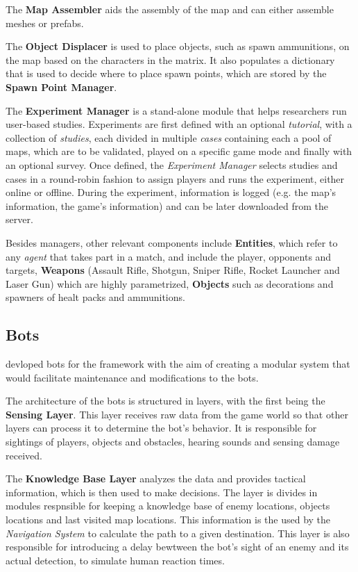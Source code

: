 \documentclass{Configuration_Files/PoliMi3i_thesis}
\begin{document}
The \textbf{Map Assembler} aids the assembly of the map and can either assemble meshes or prefabs.

The \textbf{Object Displacer} is used to place objects, such as spawn ammunitions, on the map based on the characters in the matrix. It also populates a dictionary that is used to decide where to place spawn points, which are stored by the \textbf{Spawn Point Manager}.

The \textbf{Experiment Manager} is a stand-alone module that helps researchers run user-based studies. Experiments are first defined with an optional \textit{tutorial}, with a collection of \textit{studies}, each divided in multiple \textit{cases} containing each a pool of maps, which are to be validated, played on a specific game mode and finally with an optional survey. Once defined, the \textit{Experiment Manager} selects studies and cases in a round-robin fashion to assign players and runs the experiment, either online or offline. During the experiment, information is logged (e.g. the map's information, the game's information) and can be later downloaded from the server.

Besides managers, other relevant components include \textbf{Entities}, which refer to any \textit{agent} that takes part in a match, and include the player, opponents and targets, \textbf{Weapons} (Assault Rifle, Shotgun, Sniper Rifle, Rocket Launcher and Laser Gun) which are highly parametrized, \textbf{Objects} such as decorations and spawners of healt packs and ammunitions. 

\subsection{Bots}
\label{subsec:bots}

\citeauthor{bari_evolutionary-based_2023} devloped bots for the framework with the aim of creating a modular system that would facilitate maintenance and modifications to the bots. \cite{bari_evolutionary-based_2023}

The architecture of the bots is structured in layers, with the first being the \textbf{Sensing Layer}. This layer receives raw data from the game world so that other layers can process it to determine the bot's behavior. It is responsible for sightings of players, objects and obstacles, hearing sounds and sensing damage received.

The \textbf{Knowledge Base Layer} analyzes the data and provides tactical information, which is then used to make decisions. The layer is divides in modules respnsible for keeping a knowledge base of enemy locations, objects locations and last visited map locations. This information is the used by the \textit{Navigation System} to calculate the path to a given destination. This layer is also responsible for introducing a delay bewtween the bot's sight of an enemy and its actual detection, to simulate human reaction times.
\end{document}
